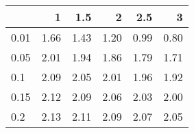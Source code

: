 
\begin{tabular}{lrrrrr}
\toprule
  & 1 & 1.5 & 2 & 2.5 & 3\\
\midrule
0.01 & 1.66 & 1.43 & 1.20 & 0.99 & 0.80\\
0.05 & 2.01 & 1.94 & 1.86 & 1.79 & 1.71\\
0.1 & 2.09 & 2.05 & 2.01 & 1.96 & 1.92\\
0.15 & 2.12 & 2.09 & 2.06 & 2.03 & 2.00\\
0.2 & 2.13 & 2.11 & 2.09 & 2.07 & 2.05\\
\bottomrule
\end{tabular}
